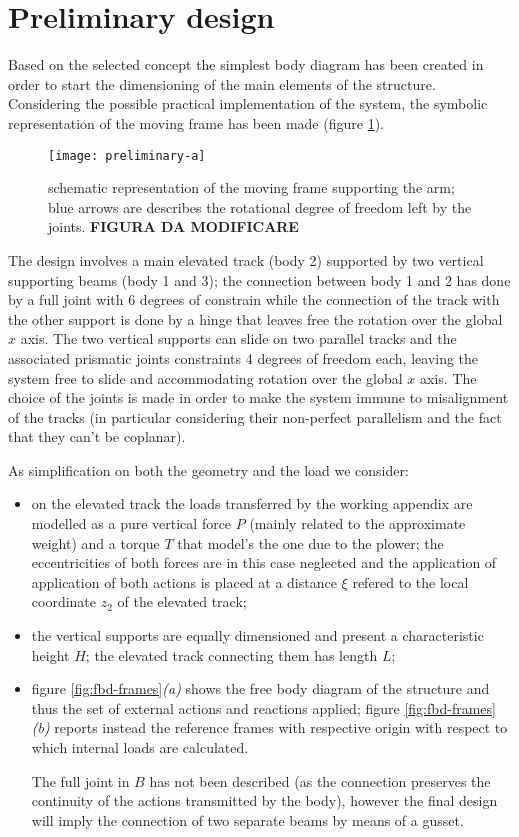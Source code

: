 \section{Preliminary design}
	Based on the selected concept the simplest body diagram has been created in order to start the dimensioning of the main elements of the structure. Considering the possible practical implementation of the system, the symbolic representation of the moving frame has been made (figure \ref{fig:freebodydiagramframe}).
	
	\begin{figure}[bht]
		\centering \texttt{[image: preliminary-a]}
		\caption{schematic representation of the moving frame supporting the arm; blue arrows are describes the rotational degree of freedom left by the joints. \textbf{FIGURA DA MODIFICARE}}
		\label{fig:freebodydiagramframe}
	\end{figure}
	
	The design involves a main elevated track (body 2) supported by two vertical supporting beams (body 1 and 3); the connection between body 1 and 2 has done by a full joint with 6 degrees of constrain while the connection of the track with the other support is done by a hinge that leaves free the rotation over the global $x$ axis. The two vertical supports can slide on two parallel tracks and the associated prismatic joints constraints 4 degrees of freedom each, leaving the system free to slide and accommodating rotation over the global $x$ axis. The choice of the joints is made in order to make the system immune to misalignment of the tracks (in particular considering their non-perfect parallelism and the fact that they can't be coplanar).
	
	As simplification on both the geometry and the load we consider:
	\begin{itemize}
		\item on the elevated track the loads transferred by the working appendix are modelled as a pure vertical force $P$ (mainly related to the approximate weight) and a torque $T$ that model's the one due to the plower; the eccentricities of both forces are in this case neglected and the application of application of both actions is placed at a distance $\xi$ refered to the local coordinate $z_2$ of the elevated track;
		
		\item the vertical supports are equally dimensioned and present a characteristic height $H$; the elevated track connecting them has length $L$;
		
		\item figure \ref{fig:fbd-frames}\textit{(a)} shows the free body diagram of the structure and thus the set of external actions and reactions applied; figure \ref{fig:fbd-frames}\textit{(b)} reports instead the reference frames with respective origin with respect to which internal loads are calculated.
		
		The full joint in $B$ has not been described (as the connection preserves the continuity of the actions transmitted by the body), however the final design will imply the connection of two separate beams by means of a gusset.	
		
	\end{itemize}
	
